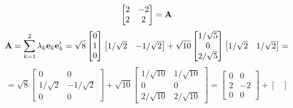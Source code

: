 \begin{enumerate}[label=(\alph*)]
\[\begin{bmatrix}
                    2 & -2 \\
                    2 & 2
                \end{bmatrix}
                =
                \bold{A}
            \]
            \[
                \bold{A}
                =
                \sum_{k=1}^2{\lambda_k\bold{e}_k\bold{e}_k^\prime}
                =
                \sqrt{8}
                \begin{bmatrix}
                    0 \\
                    1 \\
                    0
                \end{bmatrix}
                \begin{bmatrix}
                    1/\sqrt{2} & -1/\sqrt{2}
                \end{bmatrix}
                +
                \sqrt{10}
                \begin{bmatrix}
                    1/\sqrt{5} \\
                    0 \\
                    2/\sqrt{5}
                \end{bmatrix}
                \begin{bmatrix}
                    1/\sqrt{2} & 1/\sqrt{2}
                \end{bmatrix}
                =
            \]
            \[
                =
                \sqrt{8}
                \begin{bmatrix}
                    0 & 0 \\
                    1/\sqrt{2} & -1/\sqrt{2} \\
                    0 & 0
                \end{bmatrix}
                +
                \sqrt{10}
                \begin{bmatrix}
                    1/\sqrt{10} & 1/\sqrt{10} \\
                    0 & 0 \\
                    2/\sqrt{10} & 2/\sqrt{10}
                \end{bmatrix}
                =
                \begin{bmatrix}
                    0 & 0 \\
                    2 & -2 \\
                    0 & 0
                \end{bmatrix}
                +
                \begin{bmatrix}

\end{bmatrix}\]
\end{enumerate}
